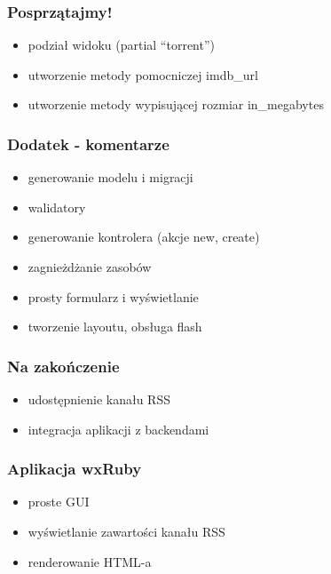\documentclass[12t]{beamer}
\begin{document}
\begin{frame}
  \frametitle{Posprzątajmy!}
  \begin{itemize}
  \item podział widoku (partial ``torrent'')
  \item utworzenie metody pomocniczej imdb\_url
  \item utworzenie metody wypisującej rozmiar in\_megabytes
  \end{itemize}
\end{frame}

\begin{frame}
  \frametitle{Dodatek - komentarze}
  \begin{itemize}
  \item generowanie modelu i migracji
  \item walidatory
  \item generowanie kontrolera (akcje new, create)
  \item zagnieżdżanie zasobów
  \item prosty formularz i wyświetlanie
  \item tworzenie layoutu, obsługa flash
  \end{itemize}
\end{frame}

\begin{frame}
  \frametitle{Na zakończenie}
  \begin{itemize}
  \item udostępnienie kanału RSS
  \item integracja aplikacji z backendami
  \end{itemize}
\end{frame}

\begin{frame}
  \frametitle{Aplikacja wxRuby}
  \begin{itemize}
  \item proste GUI
  \item wyświetlanie zawartości kanału RSS
  \item renderowanie HTML-a
  \end{itemize}
\end{frame}
\end{document}
